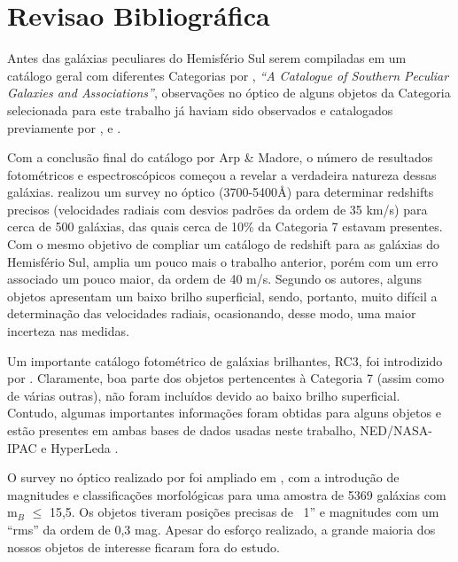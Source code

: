 
\chapter{Revisao  Bibliográfica}

Antes das galáxias peculiares do Hemisfério Sul serem compiladas em um catálogo geral com diferentes Categorias por \cite{arp1987catalogue}, \textit{“A Catalogue of Southern Peculiar Galaxies and Associations”}, observações no óptico de alguns objetos da Categoria selecionada para este trabalho já haviam sido observados e catalogados previamente por \cite{dreyer}, \cite{vorotsov1968} e \cite{vorontsov1977atlas}.

Com a conclusão final do catálogo por Arp \& Madore, o número de resultados fotométricos e espectroscópicos começou a revelar a verdadeira natureza dessas galáxias. \cite{menzies} realizou um survey no óptico (3700-5400{\AA}) para determinar redshifts precisos (velocidades radiais com desvios padrões da ordem de 35 km/s) para cerca de 500 galáxias, das quais cerca de 10\% da Categoria 7 estavam presentes. Com o mesmo objetivo de compliar um catálogo de redshift para  as galáxias do Hemisfério Sul, \cite{dacosta1991} amplia um pouco mais o trabalho anterior, porém com um erro associado um pouco maior, da ordem de 40 m/s. Segundo os autores, alguns objetos apresentam um baixo brilho superficial, sendo, portanto, muito difícil a determinação das velocidades radiais, ocasionando, desse modo, uma maior incerteza nas medidas.

Um importante catálogo fotométrico de galáxias brilhantes, RC3, foi introdizido por \cite{Vaucouleurs}. Claramente, boa parte dos objetos pertencentes à Categoria 7 (assim como de várias outras), não foram incluídos devido ao baixo brilho superficial. Contudo, algumas importantes informações foram obtidas para alguns objetos e estão presentes em ambas bases de dados usadas neste trabalho, NED/NASA-IPAC e HyperLeda \cite{paturel2003hyperleda}.

O survey no óptico realizado por \cite{dacosta1991} foi ampliado em \cite{dacosta1998}, com a introdução de magnitudes e classificações morfológicas para uma amostra de 5369 galáxias com m$_{B}$ $\leq$ 15,5. Os objetos tiveram posições precisas de ~1” e magnitudes com um “rms” da ordem de 0,3 mag. Apesar do esforço realizado, a grande maioria dos nossos objetos de interesse ficaram fora do estudo.


